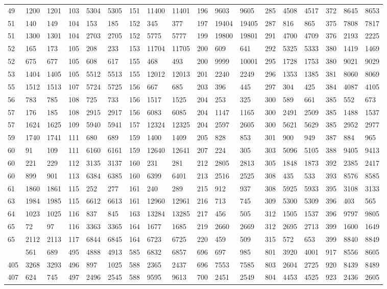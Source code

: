 \begin{center}
\begin{longtable}{*5{A@{\hspace*{5mm}}A}}
49&1200&1201&103&5304&5305&151&11400&11401&196&9603&9605&285&4508&4517&372&8645&8653\\
51&140&149&104&153&185&152&345&377&197&19404&19405&287&816&865&375&7808&7817\\
51&1300&1301&104&2703&2705&152&5775&5777&199&19800&19801&291&4700&4709&376&2193&2225\\
52&165&173&105&208&233&153&11704&11705&200&609&641&292&5325&5333&380&1419&1469\\
52&675&677&105&608&617&155&468&493&200&9999&10001&295&1728&1753&380&9021&9029\\
53&1404&1405&105&5512&5513&155&12012&12013&201&2240&2249&296&1353&1385&381&8060&8069\\
55&1512&1513&107&5724&5725&156&667&685&203&396&445&297&304&425&384&4087&4105\\
56&783&785&108&725&733&156&1517&1525&204&253&325&300&589&661&385&552&673\\
57&176&185&108&2915&2917&156&6083&6085&204&1147&1165&300&2491&2509&385&1488&1537\\
57&1624&1625&109&5940&5941&157&12324&12325&204&2597&2605&300&5621&5629&385&2952&2977\\
59&1740&1741&111&680&689&159&1400&1409&205&828&853&301&900&949&387&884&965\\
60&91&109&111&6160&6161&159&12640&12641&207&224&305&303&5096&5105&388&9405&9413\\
60&221&229&112&3135&3137&160&231&281&212&2805&2813&305&1848&1873&392&2385&2417\\
60&899&901&113&6384&6385&160&6399&6401&213&2516&2525&308&435&533&393&8576&8585\\
61&1860&1861&115&252&277&161&240&289&215&912&937&308&5925&5933&395&3108&3133\\
63&1984&1985&115&6612&6613&161&12960&12961&216&713&745&309&5300&5309&396&403&565\\
64&1023&1025&116&837&845&163&13284&13285&217&456&505&312&1505&1537&396&9797&9805\\
65&72&97&116&3363&3365&164&1677&1685&219&2660&2669&312&2695&2713&399&1600&1649\\
65&2112&2113&117&6844&6845&164&6723&6725&220&459&509&315&572&653&399&8840&8849\\
&561&689&495&4888&4913&585&6832&6857&696&697&985&801&3920&4001&917&8556&8605\\
405&3268&3293&496&897&1025&588&2365&2437&696&7553&7585&803&2604&2725&920&8439&8489\\
407&624&745&497&2496&2545&588&9595&9613&700&2451&2549&804&4453&4525&923&2436&2605\\

\end{longtable}
\end{center}
